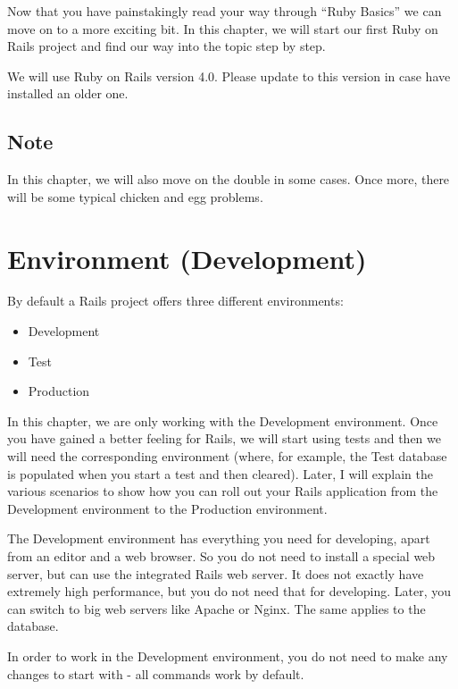 \documentclass[a4paper]{book}
\newcounter{tab}[chapter]
\begin{document}
Now that you have painstakingly read your way through “Ruby Basics” we can move on to a more exciting bit. In this chapter, we will start our first Ruby on Rails project and find our way into the topic step by step.

We will use Ruby on Rails version 4.0. Please update to this version in case have installed an older one.

\subsection{Note}\label{note-12}

In this chapter, we will also move on the double in some cases. Once more, there will be some typical chicken and egg problems.

\section{Environment (Development)}\label{environment-development}

By default a Rails project offers three different environments:

\begin{itemize}
\itemsep1pt\parskip0pt
\item
  Development
\item
  Test
\item
  Production
\end{itemize}

In this chapter, we are only working with the Development environment. Once you have gained a better feeling for Rails, we will start using tests and then we will need the corresponding environment (where, for example, the Test database is populated when you start a test and then cleared). Later, I will explain the various scenarios to show how you can roll out your Rails application from the Development environment to the Production environment.

The Development environment has everything you need for developing, apart from an editor and a web browser. So you do not need to install a special web server, but can use the integrated Rails web server. It does not exactly have extremely high performance, but you do not need that for developing. Later, you can switch to big web servers like Apache or Nginx. The same applies to the database.

In order to work in the Development environment, you do not need to make any changes to start with - all commands work by default.
\end{document}
